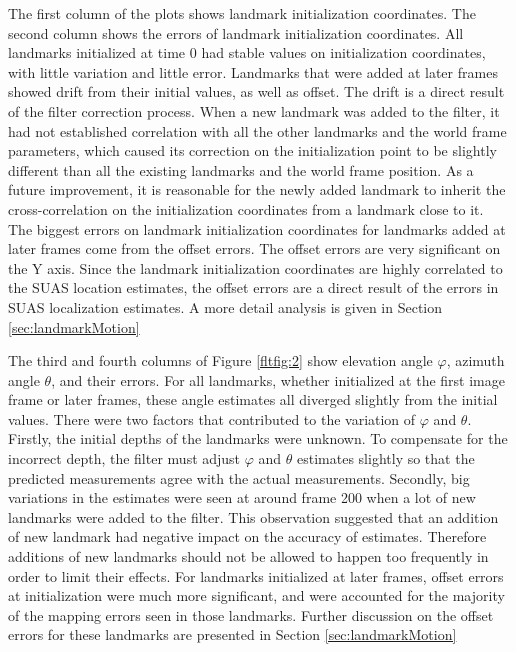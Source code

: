 The first column of the plots shows landmark initialization coordinates.
The second column shows the errors of landmark initialization coordinates.
All landmarks initialized at time 0 had stable values on
initialization coordinates, with little variation and little error.
Landmarks that were added at later frames showed drift from their
initial values, as well as offset. The drift is a direct result of the
filter correction process. When a new landmark was added to the
filter, it had not established correlation with all the other
landmarks and the world frame parameters, which caused its correction
on the initialization point to be slightly different than all the existing
landmarks and the world frame position. As a future improvement, it is
reasonable for the newly added landmark to inherit the
cross-correlation on the initialization coordinates from a landmark
close to it. The biggest errors on landmark initialization
coordinates for landmarks added at later frames come from the offset
errors. The offset errors are very significant on the Y axis.
Since the landmark initialization coordinates are highly
correlated to the SUAS location estimates, the offset errors are a
direct result of the errors in SUAS localization estimates. A more detail
analysis is given in Section \ref{sec:landmarkMotion}

The third and fourth columns of Figure \ref{fltfig:2} show elevation
angle $\varphi$, azimuth angle $\theta$, and their errors. For all
landmarks, whether initialized at the first image frame or later frames,
these angle estimates all diverged slightly from the initial values.
There were two factors that contributed to the variation of $\varphi$
and $\theta$. Firstly, the initial depths of the landmarks were
unknown. To compensate for the incorrect depth, the filter must adjust
$\varphi$ and $\theta$ estimates slightly so that the predicted
measurements agree with the actual measurements. Secondly, big
variations in the estimates were seen at around frame 200 when a lot
of new landmarks were added to the filter. This observation suggested
that an addition of new landmark had negative impact on the accuracy of
estimates. Therefore additions of new landmarks should not be allowed
to happen too frequently in order to limit their effects. For
landmarks initialized at later frames, offset errors at initialization
were much more significant, and were accounted for the majority of the
mapping errors seen in those landmarks. Further discussion on the offset
errors for these landmarks are presented in Section
\ref{sec:landmarkMotion}

